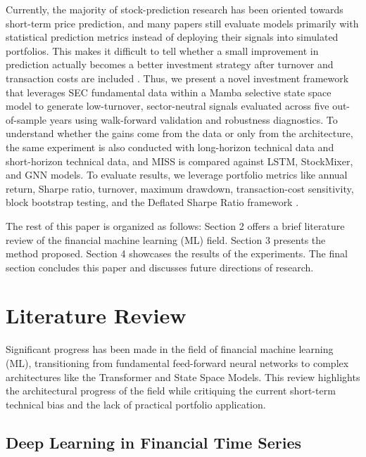 \documentclass[11pt,twocolumn]{article}
\begin{document}
Currently, the majority of stock-prediction research has been oriented
towards short-term price prediction, and many papers still evaluate
models primarily with statistical prediction metrics instead of
deploying their signals into simulated portfolios. This makes it
difficult to tell whether a small improvement in prediction actually
becomes a better investment strategy after turnover and transaction
costs are included \cite{fischer2018,demiguel2020}. Thus, we present a
novel investment framework that leverages SEC fundamental data within a
Mamba selective state space model to generate low-turnover,
sector-neutral signals evaluated across five out-of-sample years using
walk-forward validation and robustness diagnostics. To understand whether
the gains come from the data or only from the architecture, the same
experiment is also conducted with long-horizon technical data and
short-horizon technical data, and MISS is compared against LSTM,
StockMixer, and GNN models. To evaluate results, we leverage portfolio
metrics like annual return, Sharpe ratio, turnover, maximum drawdown,
transaction-cost sensitivity, block bootstrap testing, and the Deflated
Sharpe Ratio framework \cite{bailey2014}.

The rest of this paper is organized as follows: Section 2 offers a brief
literature review of the financial machine learning (ML) field. Section
3 presents the method proposed. Section 4 showcases the results of the
experiments. The final section concludes this paper and discusses future
directions of research.

\section{Literature Review}

Significant progress has been made in the field of financial machine
learning (ML), transitioning from fundamental feed-forward neural
networks to complex architectures like the Transformer and State Space
Models. This review highlights the architectural progress of the field
while critiquing the current short-term technical bias and the lack of
practical portfolio application.

\subsection{Deep Learning in Financial Time Series}
\end{document}
